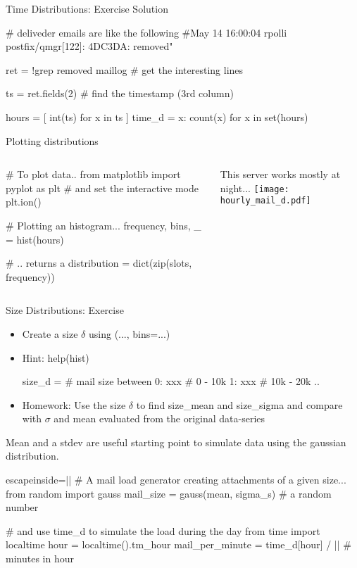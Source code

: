 \iftrue
\begin{pyframe}{Time Distributions: Exercise Solution}
\begin{pycode}
# deliveder emails are like the following 
#May 14 16:00:04 rpolli postfix/qmgr[122]: 4DC3DA: removed"
    
ret = !grep removed maillog # get the interesting lines

ts = ret.fields(2) # find the timestamp (3rd column)

hours = [ int(ts)  for x in ts ]
time_d = {x: count(x) for x in set(hours)}
\end{pycode}
\end{pyframe}

\fi 

\begin{pyframe}{Plotting distributions}
\begin{columns}
\begin{pycode}
# To plot data..
from matplotlib import pyplot as plt
# and set the interactive mode
plt.ion()

# Plotting an histogram... 
frequency, bins, _ = hist(hours)

# .. returns a 
distribution = dict(zip(slots, 
    frequency))
\end{pycode}
This server works mostly at night...
\texttt{[image: hourly\_mail\_d.pdf]}
\end{columns}
\end{pyframe}

\begin{pyframe}{Size Distributions: Exercise}
\begin{itemize}
\item Create a size $\delta$ using (..., bins=...)
\item Hint: help(hist)
\begin{pycode}
size_d = {  # mail size between
    0: xxx  #  0 - 10k
    1: xxx  #  10k - 20k
    ..
    }
\end{pycode}
\item Homework: Use the size $\delta$ to find size\_mean and size\_sigma and compare with $\sigma$ and mean evaluated from the original data-series
\end{itemize}
\end{pyframe}



\begin{pyframe}{}
Mean and a stdev are useful starting point to simulate data using the gaussian distribution.
\begin{pycode*}{escapeinside=||}
# A mail load generator creating attachments of a given size...
from random import gauss
mail_size = gauss(mean, sigma_s) # a random number

# and use time_d to simulate the load during the day
from time import localtime
hour = localtime().tm_hour
mail_per_minute = time_d[hour] / || # minutes in hour
\end{pycode*}
\end{pyframe}



